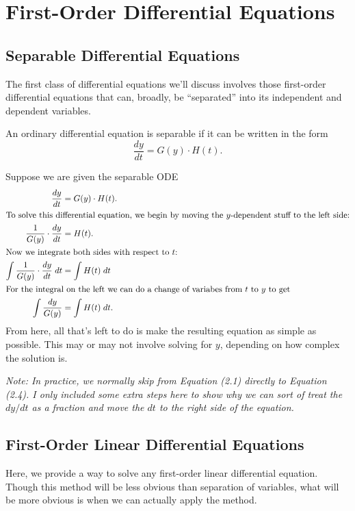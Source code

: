 \documentclass[../m082main.tex]{subfiles}
\begin{document}
\chapter{First-Order Differential Equations}

\section{Separable Differential Equations}
The first class of differential equations we'll discuss involves those first-order differential equations that can, broadly, be ``separated'' into its independent and dependent variables.

\begin{definition}
    An ordinary differential equation is separable if it can be written in the form
    \[ \frac{dy}{dt} = G(y) \cdot H(t). \]
\end{definition}

\begin{example}
    Suppose we are given the separable ODE
    \begin{align}
        \frac{dy}{dt} &= G(y) \cdot H(t). \\
        \intertext{To solve this differential equation, we begin by moving the $y$-dependent stuff to the left side:}
        \frac{1}{G(y)} \cdot \frac{dy}{dt} &= H(t). \\
        \intertext{Now we integrate both sides with respect to $t$:}
        \int \frac{1}{G(y)} \cdot \frac{dy}{dt} \;dt &= \int H(t) \;dt \\
        \intertext{For the integral on the left we can do a change of variabes from $t$ to $y$ to get}
        \int \frac{dy}{G(y)} &= \int H(t) \;dt.
    \end{align}
    From here, all that's left to do is make the resulting equation as simple as possible.
    This may or may not involve solving for $y$, depending on how complex the solution is.

    \medskip
    \textit{Note: In practice, we normally skip from Equation (2.1) directly to Equation (2.4).
    I only included some extra steps here to show why we can sort of treat the $dy/dt$ as a fraction and move the $dt$ to the right side of the equation.}
\end{example}

\section{First-Order Linear Differential Equations}
Here, we provide a way to solve any first-order linear differential equation.
Though this method will be less obvious than separation of variables, what will be more obvious is when we can actually apply the method.
\end{document}
